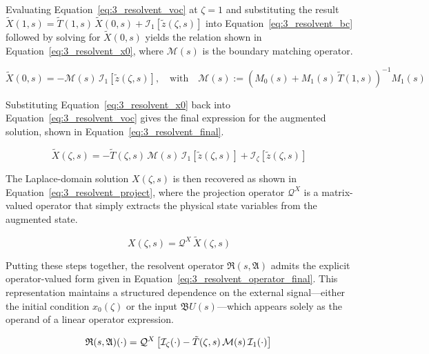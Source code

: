 Evaluating Equation~\eqref{eq:3_resolvent_voc} at $\zeta = 1$ and substituting the result $\tilde{X}(1, s) = \tilde{T}(1, s)\, \tilde{X}(0, s) + \mathcal{I}_1[\tilde{z}(\zeta, s)]$ into Equation~\eqref{eq:3_resolvent_bc} followed by solving for $\tilde{X}(0, s)$ yields the relation shown in Equation~\eqref{eq:3_resolvent_x0}, where $\mathcal{M}(s)$ is the boundary matching operator.

\begin{equation} \label{eq:3_resolvent_x0}
    \tilde{X}(0, s) = -\mathcal{M}(s)\, \mathcal{I}_1[\tilde{z}(\zeta, s)], \quad \text{with} \quad \mathcal{M}(s) := \left( M_0(s) + M_1(s)\, \tilde{T}(1, s) \right)^{-1} M_1(s)
\end{equation}

Substituting Equation~\eqref{eq:3_resolvent_x0} back into Equation~\eqref{eq:3_resolvent_voc} gives the final expression for the augmented solution, shown in Equation~\eqref{eq:3_resolvent_final}. 

\begin{equation} \label{eq:3_resolvent_final}
\tilde{X}(\zeta, s) = -\tilde{T}(\zeta, s)\, \mathcal{M}(s)\, \mathcal{I}_1[\tilde{z}(\zeta, s)] + \mathcal{I}_\zeta[\tilde{z}(\zeta, s)]
\end{equation}

The Laplace-domain solution $X(\zeta, s)$ is then recovered as shown in Equation~\eqref{eq:3_resolvent_project}, where the projection operator $\mathcal{Q}^X$ is a matrix-valued operator that simply extracts the physical state variables from the augmented state.

\begin{equation} \label{eq:3_resolvent_project}
    X(\zeta, s) = \mathcal{Q}^X\, \tilde{X}(\zeta, s)
\end{equation}

Putting these steps together, the resolvent operator $\mathfrak{R}(s, \mathfrak{A})$ admits the explicit operator-valued form given in Equation~\eqref{eq:3_resolvent_operator_final}. This representation maintains a structured dependence on the external signal—either the initial condition $x_0(\zeta)$ or the input $\mathfrak{B} U(s)$—which appears solely as the operand of a linear operator expression.

\begin{equation} \label{eq:3_resolvent_operator_final}
    \mathfrak{R}(s, \mathfrak{A}) (\cdot) = \mathcal{Q}^X \left[ \mathcal{I}_\zeta (\cdot) - \tilde{T}(\zeta, s)\, \mathcal{M}(s)\, \mathcal{I}_1 (\cdot)  \right] \\
\end{equation}

